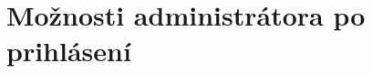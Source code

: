 \documentclass[12pt,a4paper]{report}
\theoremstyle{definition}
\theoremstyle{remark}
\begin{document}
\section{Možnosti administrátora po prihlásení}



\end{document}
